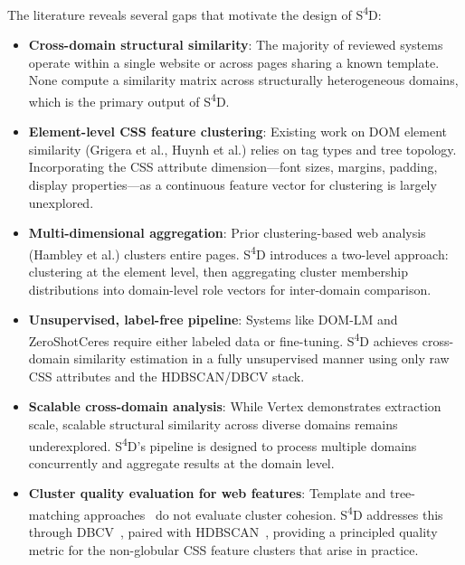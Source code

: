 The literature reveals several gaps that motivate the design of S\textsuperscript{4}D:

\begin{itemize}
    \item \textbf{Cross-domain structural similarity}: The majority of reviewed systems operate within a single website or across pages sharing a known template. None compute a similarity matrix across structurally heterogeneous domains, which is the primary output of S\textsuperscript{4}D.

    \item \textbf{Element-level CSS feature clustering}: Existing work on DOM element similarity (Grigera et al., Huynh et al.) relies on tag types and tree topology. Incorporating the CSS attribute dimension---font sizes, margins, padding, display properties---as a continuous feature vector for clustering is largely unexplored.

    \item \textbf{Multi-dimensional aggregation}: Prior clustering-based web analysis (Hambley et al.) clusters entire pages. S\textsuperscript{4}D introduces a two-level approach: clustering at the element level, then aggregating cluster membership distributions into domain-level role vectors for inter-domain comparison.

    \item \textbf{Unsupervised, label-free pipeline}: Systems like DOM-LM and ZeroShotCeres require either labeled data or fine-tuning. S\textsuperscript{4}D achieves cross-domain similarity estimation in a fully unsupervised manner using only raw CSS attributes and the HDBSCAN/DBCV stack.

    \item \textbf{Scalable cross-domain analysis}: While Vertex demonstrates extraction scale, scalable structural similarity across diverse domains remains underexplored. S\textsuperscript{4}D's pipeline is designed to process multiple domains concurrently and aggregate results at the domain level.

    \item \textbf{Cluster quality evaluation for web features}: Template and tree-matching approaches~\cite{larroque2014template,brisset2022sftm} do not evaluate cluster cohesion. S\textsuperscript{4}D addresses this through DBCV~\cite{moulavi2014dbcv}, paired with HDBSCAN~\cite{campello2015hdbscan}, providing a principled quality metric for the non-globular CSS feature clusters that arise in practice.


\end{itemize}
